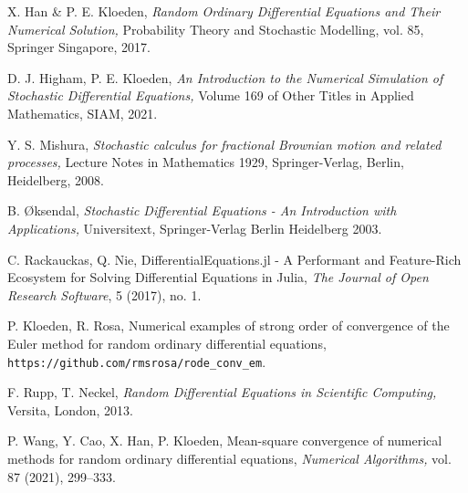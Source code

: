 \documentclass[reqno,12pt]{amsart}
\theoremstyle{plain}%
\theoremstyle{definition}
\begin{document}
\begin{thebibliography}{25}
     X. Han \& P. E. Kloeden, \emph{Random Ordinary Differential Equations and Their Numerical Solution,} Probability Theory and Stochastic Modelling, vol. 85, Springer Singapore, 2017.

     D. J. Higham, P. E. Kloeden, \emph{An Introduction to the Numerical Simulation of Stochastic Differential Equations,} Volume 169 of Other Titles in Applied Mathematics, SIAM, 2021.

     Y. S. Mishura, \emph{Stochastic calculus for fractional Brownian motion and related processes,} Lecture Notes in Mathematics 1929, Springer-Verlag, Berlin, Heidelberg, 2008.

     B. {\O}ksendal, \emph{Stochastic Differential Equations - An Introduction with Applications,} Universitext, Springer-Verlag Berlin Heidelberg 2003.

     C. Rackauckas, Q. Nie, DifferentialEquations.jl - A Performant and Feature-Rich Ecosystem for Solving Differential Equations in Julia, \emph{The Journal of Open Research Software}, 5 (2017), no. 1.

     P. Kloeden, R. Rosa, Numerical examples of strong order of convergence of the Euler method for random ordinary differential equations, \texttt{https://github.com/rmsrosa/rode\_conv\_em}.

     F. Rupp, T. Neckel, \emph{Random Differential Equations in Scientific Computing,} Versita, London, 2013.

     P. Wang, Y. Cao, X. Han, P. Kloeden, Mean-square convergence of numerical methods for random ordinary differential equations, \emph{Numerical Algorithms,} vol. 87 (2021), 299--333.

\end{thebibliography}
\end{document}
